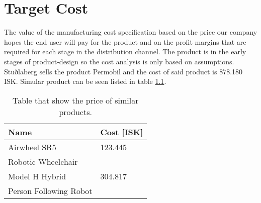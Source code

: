 \chapter{Target Cost}
The value of the manufacturing cost specification based on the price our company hopes the end user will pay for the product and on the profit margins that are required for each stage in the distribution channel. The product is in the early stages of product-design so the cost analysis is only based on assumptions. Stuðlaberg sells the product Permobil and the cost of said product is 878.180 ISK. Simular product can be seen listed in table \ref{tab:cost_analysis}.

\begin{table}[!h]
    \centering
        \setlength{\tabcolsep}{18pt}
        \renewcommand{\arraystretch}{1.2}
        \begin{tabular}{ll}
\hline
Name & Cost [ISK] \\ 
\hline\hline
Airwheel SR5 & 123.445 \cite{airwheel_functions_2022}\\
Robotic Wheelchair & \\
Model H Hybrid & 304.817 \cite{jdy_imports_model_2022}\\
Person Following Robot & \\
\hline
\end{tabular}
\caption{Table that show the price of similar products.}
\label{tab:cost_analysis}
\end{table}